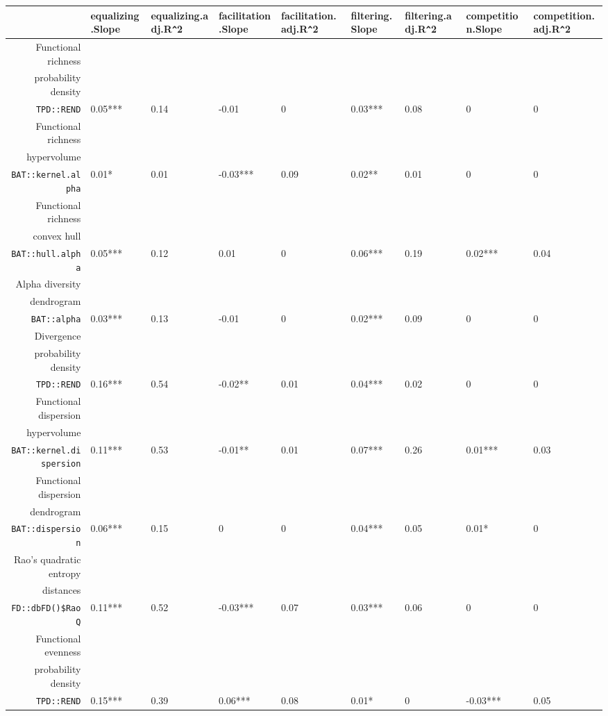 \begin{table}[ht]
\centering
\scriptsize
\begin{tabular}{rllllllll}
  \hline
 & equalizing.Slope & equalizing.adj.R\verb|^|2 & facilitation.Slope & facilitation.adj.R\verb|^|2 & filtering.Slope & filtering.adj.R\verb|^|2 & competition.Slope & competition.adj.R\verb|^|2 \\ 
  \hline
Functional richness\\ probability density\\ \texttt{TPD::REND} & 0.05*** & 0.14 & -0.01 & 0 & 0.03*** & 0.08 & 0 & 0 \\ 
  Functional richness\\ hypervolume\\ \texttt{BAT::kernel.alpha} & 0.01* & 0.01 & -0.03*** & 0.09 & 0.02** & 0.01 & 0 & 0 \\ 
  Functional richness\\ convex hull\\ \texttt{BAT::hull.alpha} & 0.05*** & 0.12 & 0.01 & 0 & 0.06*** & 0.19 & 0.02*** & 0.04 \\ 
  Alpha diversity\\ dendrogram\\ \texttt{BAT::alpha} & 0.03*** & 0.13 & -0.01 & 0 & 0.02*** & 0.09 & 0 & 0 \\ 
  Divergence\\ probability density\\ \texttt{TPD::REND} & 0.16*** & 0.54 & -0.02** & 0.01 & 0.04*** & 0.02 & 0 & 0 \\ 
  Functional dispersion\\ hypervolume\\ \texttt{BAT::kernel.dispersion} & 0.11*** & 0.53 & -0.01** & 0.01 & 0.07*** & 0.26 & 0.01*** & 0.03 \\ 
  Functional dispersion\\ dendrogram\\ \texttt{BAT::dispersion} & 0.06*** & 0.15 & 0 & 0 & 0.04*** & 0.05 & 0.01* & 0 \\ 
  Rao's quadratic entropy\\ distances\\ \texttt{FD::dbFD()\$RaoQ} & 0.11*** & 0.52 & -0.03*** & 0.07 & 0.03*** & 0.06 & 0 & 0 \\ 
  Functional evenness\\ probability density\\ \texttt{TPD::REND} & 0.15*** & 0.39 & 0.06*** & 0.08 & 0.01* & 0 & -0.03*** & 0.05 \\ 

\end{tabular}
\end{table}
